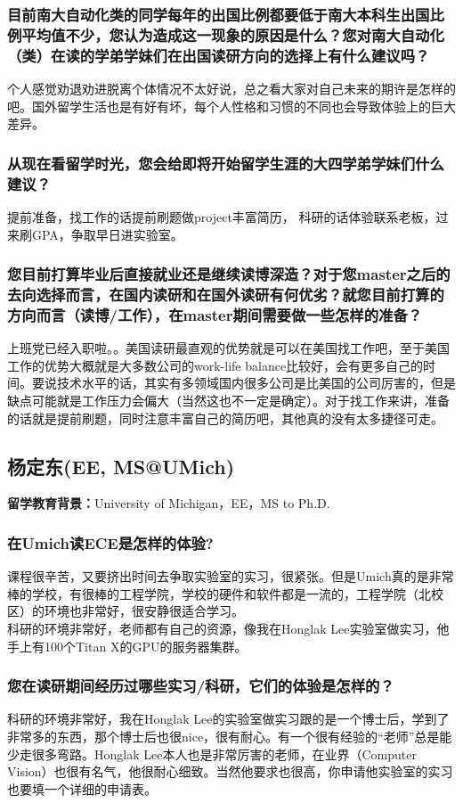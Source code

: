 \documentclass[a4paper,UTF8]{book}
\begin{document}
    \subsubsection*{目前南大自动化类的同学每年的出国比例都要低于南大本科生出国比例平均值不少，您认为造成这一现象的原因是什么？您对南大自动化（类）在读的学弟学妹们在出国读研方向的选择上有什么建议吗？}
    个人感觉劝退劝进脱离个体情况不太好说，总之看大家对自己未来的期许是怎样的吧。国外留学生活也是有好有坏，每个人性格和习惯的不同也会导致体验上的巨大差异。

    \subsubsection*{从现在看留学时光，您会给即将开始留学生涯的大四学弟学妹们什么建议？}
    提前准备，找工作的话提前刷题做project丰富简历， 科研的话体验联系老板，过来刷GPA，争取早日进实验室。

    \subsubsection*{您目前打算毕业后直接就业还是继续读博深造？对于您master之后的去向选择而言，在国内读研和在国外读研有何优劣？就您目前打算的方向而言（读博/工作），在master期间需要做一些怎样的准备？}
    上班党已经入职啦。。美国读研最直观的优势就是可以在美国找工作吧，至于美国工作的优势大概就是大多数公司的work-life balance比较好，会有更多自己的时间。要说技术水平的话，其实有多领域国内很多公司是比美国的公司厉害的，但是缺点可能就是工作压力会偏大（当然这也不一定是确定）。对于找工作来讲，准备的话就是提前刷题，同时注意丰富自己的简历吧，其他真的没有太多捷径可走。


\clearpage
\subsection{杨定东(EE, MS@UMich)}
    \textbf{留学教育背景：}University of Michigan，EE，MS to Ph.D.

    \subsubsection*{在Umich读ECE是怎样的体验?}
    课程很辛苦，又要挤出时间去争取实验室的实习，很紧张。但是Umich真的是非常棒的学校，有很棒的工程学院，学校的硬件和软件都是一流的，工程学院（北校区）的环境也非常好，很安静很适合学习。\\
    科研的环境非常好，老师都有自己的资源，像我在Honglak Lee实验室做实习，他手上有100个Titan X的GPU的服务器集群。
    \subsubsection*{您在读研期间经历过哪些实习/科研，它们的体验是怎样的？}
    科研的环境非常好，我在Honglak Lee的实验室做实习跟的是一个博士后，学到了非常多的东西，那个博士后也很nice，很有耐心。有一个很有经验的“老师”总是能少走很多弯路。Honglak Lee本人也是非常厉害的老师，在业界（Computer Vision）也很有名气，他很耐心细致。当然他要求也很高，你申请他实验室的实习也要填一个详细的申请表。
\end{document}
